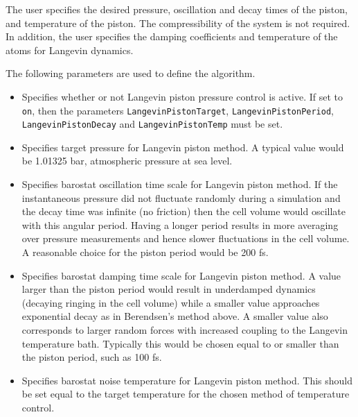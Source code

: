 The user specifies the desired pressure, oscillation and decay times
of the piston, and temperature of the piston.  The compressibility of  
the system is not required.  In addition, the user specifies the
damping coefficients and temperature of the atoms for Langevin dynamics.

The following parameters are used to define the algorithm.  

\begin{itemize}

\item
{}
{Specifies whether or not Langevin piston pressure control is active.  
If set to {\tt on}, then the parameters {\tt LangevinPistonTarget}, {\tt LangevinPistonPeriod}, {\tt LangevinPistonDecay} and {\tt LangevinPistonTemp} must be set.}

\item
{}
{Specifies target pressure for Langevin piston method.
A typical value would be 1.01325 bar, atmospheric pressure at sea level.}

\item
{}
{Specifies barostat oscillation time scale for Langevin piston method.
If the instantaneous pressure did not fluctuate randomly during a simulation
and the decay time was infinite (no friction) then the cell volume would
oscillate with this angular period.
Having a longer period results in more averaging over pressure measurements
and hence slower fluctuations in the cell volume.
A reasonable choice for the piston period would be 200 fs.
}

\item
{}
{Specifies barostat damping time scale for Langevin piston method.
A value larger than the piston period would result in underdamped
dynamics (decaying ringing in the cell volume) while a smaller value
approaches exponential decay as in Berendsen's method above.
A smaller value also corresponds to larger random forces with increased
coupling to the Langevin temperature bath.
Typically this would be chosen equal to or smaller than the piston period,
such as 100 fs.
}

\item
{}
{Specifies barostat noise temperature for Langevin piston method.
This should be set equal to the target temperature for the chosen method of temperature control.}


\end{itemize}
